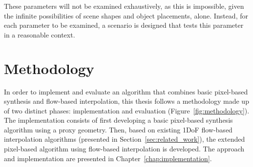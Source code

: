 These parameters will not be examined exhaustively, as this is impossible, given the infinite possibilities of scene shapes and object placements, alone. Instead, for each parameter to be examined, a scenario is designed that tests this parameter in a reasonable context.


%
%
%
%

\section*{Methodology}
In order to implement and evaluate an algorithm that combines basic pixel-based synthesis and flow-based interpolation, this thesis follows a methodology made up of two distinct phases: implementation and evaluation (Figure~\ref{fig:methodology}). The implementation consists of first developing a basic pixel-based synthesis algorithm using a proxy geometry. Then, based on existing 1DoF flow-based interpolation algorithms (presented in Section~\ref{sec:related_work}), the extended pixel-based algorithm using flow-based interpolation is developed. The approach and implementation are presented in Chapter~\ref{chap:implementation}.

